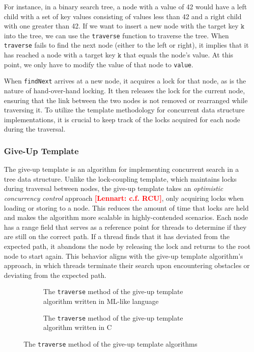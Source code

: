\documentclass[a4paper,UKenglish,cleveref, autoref, thm-restate]{lipics-v2021}
\newcommand{\lb}[1]{\textbf{\textcolor{red}{[Lennart: #1]}}}
\begin{document}
For instance, in a binary search tree, a node with a value of 42 would have a left child with a set of key values consisting of values less than 42 and a right child with one greater than 42. If we want to insert a new node with the target key $\texttt{k}$ into the tree, we can use the \lstinline{traverse} function to traverse the tree. When \lstinline{traverse} fails to find the next node (either to the left or right), it implies that it has reached a node with a target key $\texttt{k}$ that equals the node's value. At this point, we only have to modify the value of that node to \lstinline{value}.

When \lstinline{findNext} arrives at a new node, it acquires a lock for that node, as is the nature of hand-over-hand locking. It then releases the lock for the current node, ensuring that the link between the two nodes is not removed or rearranged while traversing it. To utilize the template methodology for concurrent data structure implementations, it is crucial to keep track of the locks acquired for each node during the traversal. 

\subsubsection{Give-Up Template}
The give-up template is an algorithm for implementing concurrent search in a tree data structure. Unlike the lock-coupling template, which maintains locks during traversal between nodes, the give-up template takes an \emph{optimistic concurrency control} approach \lb{c.f. RCU}, only acquiring locks when loading or storing to a node. This reduces the amount of time that locks are held and makes the algorithm more scalable in highly-contended scenarios. Each node has a range field that serves as a reference point for threads to determine if they are still on the correct path. If a thread finds that it has deviated from the expected path, it abandons the node by releasing the lock and returns to the root node to start again. This behavior aligns with the give-up template algorithm's approach, in which threads terminate their search upon encountering obstacles or deviating from the expected path.

\begin{figure}[!ht]
	\begin{subfigure}[t]{0.45\textwidth}
		 
		\caption{The \lstinline{traverse} method of the give-up template algorithm written in ML-like language}
		\label{traverse_giveup_a}	
	\end{subfigure}\qquad
	\begin{subfigure}[t]{0.48\textwidth}
		 
		\caption{The \lstinline{traverse} method of the give-up template algorithm written in C}
		\label{traverse_giveup_b}
	\end{subfigure}
	\caption{The \lstinline{traverse} method of the give-up template algorithms}
	\label{traverse_giveup}
\end{figure}
\end{document}
